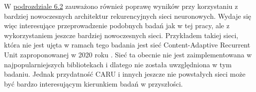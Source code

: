 \documentclass[10pt,a4paper]{article}
\begin{document}
W \hyperlink{subsection.6.2}{podrozdziale 6.2} zauważono również poprawę wyników przy korzystaniu z bardziej nowoczesnych architektur rekurencyjnych sieci neuronowych. Wydaje się więc interesujące przeprowadzenie podobnych badań jak w tej pracy, ale z wykorzystaniem jeszcze bardziej nowoczesnych sieci. Przykładem takiej sieci, która nie jest ujęta w ramach tego badania jest sieć Content-Adaptive Recurrent Unit zaproponowanej w 2020 roku \cite{chan2020caru}. Sieć ta obecnie nie jest zaimplementowana w najpopularniejszych bibliotekach i dlatego nie została uwzględniona w tym badaniu. Jednak przydatność CARU i innych jeszcze nie powstałych sieci może być bardzo interesującym kierunkiem badań w przyszłości. 

\printbibliography[title=Bibliografia]
\end{document}
